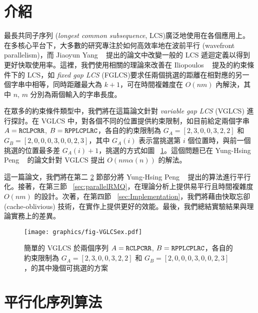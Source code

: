 \documentclass{gapd}
\begin{document}
\maketitle

\section{介紹} %
\label{sec:Introduction}

最長共同子序列 (\emph{longest common subsequence}, LCS)廣泛地使用在各個應用上。在多核心平台下，大多數的研究專注於如何高效率地在波前平行 (wavefront parallelism)，而 Jiaoyun Yang ~\cite{jiaoyun} 提出的論文中改變一般的 LCS 遞迴定義以得到更好快取使用率。這裡，我們使用相關的理論來改善在 Iliopoulos ~\cite{iliopoulos} 提及的約束條件下的 LCS，如 \emph{fixed gap LCS } (FGLCS)要求任兩個挑選的距離在相對應的另一個字串中相等，同時距離最大為 $k+1$，可在時間複雜度在 $O(nm)$ 內解決，其中 $n$, $m$ 分別為兩個輸入的字串長度。

在眾多的約束條件類型中，我們將在這篇論文針對 \emph{variable gap LCS} (VGLCS) 進行探討。在 VGLCS 中，對各個不同的位置提供約束限制，如目前給定兩個字串 $A = \tt{RCLPCRR}$, $B = \tt{RPPLCPLRC}$，各自的約束限制為 $G_A = [2, 3, 0, 0, 3, 2, 2]$ 和 $G_B = [2, 0, 0, 0, 3, 0, 0, 2, 3]$，其中 $G_A(i)$ 表示當挑選第 $i$ 個位置時，與前一個挑選的位置最多差 $G_A(i)+1$，挑選的方式如圖 ~\ref{fig:VGLCSex}。這個問題已在 Yung-Hsing Peng ~\cite{yunghsing} 的論文針對 VGLCS 提出 $O(nm \alpha(n))$ 的解法。

這一篇論文，我們將在第二 \ref{sec:parallelSerial} 節部分將 Yung-Hsing Peng ~\cite{yunghsing} 提出的算法進行平行化。接著，在第三節 ~\ref{sec:parallelRMQ}，在理論分析上提供易平行且時間複雜度 $O(nm)$ 的設計。次著，在第四節 ~\ref{sec:Implementation}，我們將藉由快取忘卻 (cache-oblivious) 技術，在實作上提供更好的效能。最後，我們總結實驗結果與理論實務上的差異。

\begin{figure}[!thb]
  \centering
  \texttt{[image: graphics/fig-VGLCSex.pdf]}
  \caption{簡單的 VGLCS 於兩個序列 $A = \tt{RCLPCRR}$, $B = \tt{RPPLCPLRC}$，各自的約束限制為 $G_A = [2, 3, 0, 0, 3, 2, 2]$ 和 $G_B = [2, 0, 0, 0, 3, 0, 0, 2, 3]$，的其中幾個可挑選的方案}
  \label{fig:VGLCSex}
\end{figure}

\section{平行化序列算法} %
\label{sec:parallelSerial}
\end{document}
